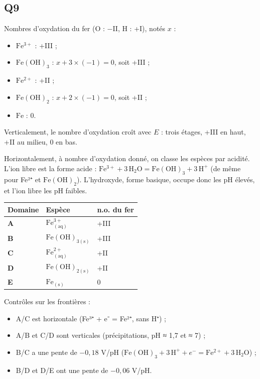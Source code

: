\documentclass[11pt,a4paper]{article}
\providecommand{\tightlist}{\setlength{\itemsep}{0pt}\setlength{\parskip}{0pt}}
\begin{document}
\hypertarget{q9}{%
\subsection{Q9}\label{q9}}

Nombres d'oxydation du fer (O : −II, H : +I), notés \(x\) :

\begin{itemize}
\tightlist
\item
  \(\mathrm{Fe^{3+}}\) : +III ;
\item
  \(\mathrm{Fe(OH)_3}\) : \(x+3\times(-1)=0\), soit +III ;
\item
  \(\mathrm{Fe^{2+}}\) : +II ;
\item
  \(\mathrm{Fe(OH)_2}\) : \(x+2\times(-1)=0\), soit +II ;
\item
  \(\mathrm{Fe}\) : 0.
\end{itemize}

Verticalement, le nombre d'oxydation croît avec \(E\) : trois étages, +III en haut, +II au milieu, 0 en bas.

Horizontalement, à nombre d'oxydation donné, on classe les espèces par acidité. L'ion libre est la forme acide : \(\mathrm{Fe^{3+}}+3\,\mathrm{H_2O}=\mathrm{Fe(OH)_3}+3\,\mathrm{H^+}\) (de même pour Fe²⁺ et \(\mathrm{Fe(OH)_2}\)). L'hydroxyde, forme basique, occupe donc les pH élevés, et l'ion libre les pH faibles.

\begin{longtable}[]{@{}lll@{}}
\toprule\noalign{}
Domaine & Espèce & n.o. du fer \\
\midrule\noalign{}
\endhead
\bottomrule\noalign{}
\endlastfoot
\textbf{A} & \(\mathrm{Fe^{3+}_{(aq)}}\) & +III \\
\textbf{B} & \(\mathrm{Fe(OH)_{3(s)}}\) & +III \\
\textbf{C} & \(\mathrm{Fe^{2+}_{(aq)}}\) & +II \\
\textbf{D} & \(\mathrm{Fe(OH)_{2(s)}}\) & +II \\
\textbf{E} & \(\mathrm{Fe_{(s)}}\) & 0 \\
\end{longtable}

Contrôles sur les frontières :

\begin{itemize}
\tightlist
\item
  A/C est horizontale (Fe³⁺ + e⁻ = Fe²⁺, sans H⁺) ;
\item
  A/B et C/D sont verticales (précipitations, pH ≈ 1,7 et ≈ 7) ;
\item
  B/C a une pente de \(-0{,}18\) V/pH (\(\mathrm{Fe(OH)_3}+3\,\mathrm{H^+}+e^-=\mathrm{Fe^{2+}}+3\,\mathrm{H_2O}\)) ;
\item
  B/D et D/E ont une pente de \(-0{,}06\) V/pH.
\end{itemize}
\end{document}
